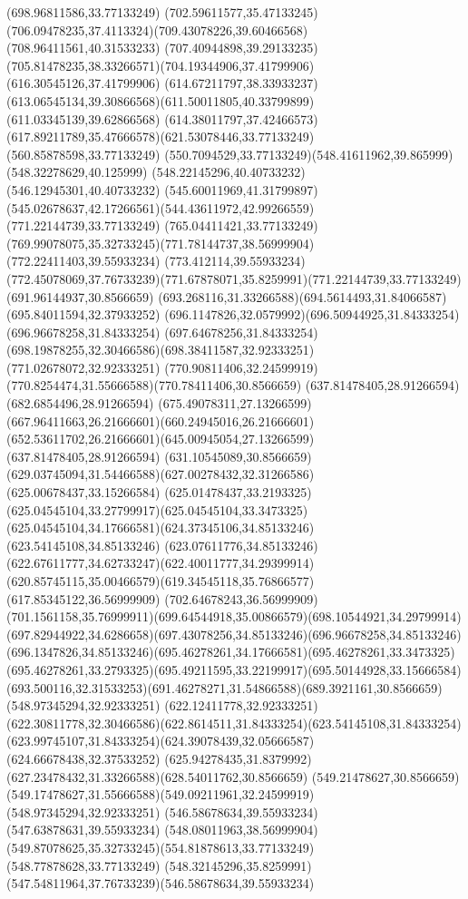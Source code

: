{{\lineto(698.96811586,33.77133249)
\curveto(702.59611577,35.47133245)(706.09478235,37.4113324)(709.43078226,39.60466568)
\lineto(708.96411561,40.31533233)
\curveto(707.40944898,39.29133235)(705.81478235,38.33266571)(704.19344906,37.41799906)
\lineto(616.30545126,37.41799906)
\curveto(614.67211797,38.33933237)(613.06545134,39.30866568)(611.50011805,40.33799899)
\lineto(611.03345139,39.62866568)
\curveto(614.38011797,37.42466573)(617.89211789,35.47666578)(621.53078446,33.77133249)
\lineto(560.85878598,33.77133249)
\curveto(550.7094529,33.77133249)(548.41611962,39.865999)(548.32278629,40.125999)
\lineto(548.22145296,40.40733232)
\lineto(546.12945301,40.40733232)
\curveto(545.60011969,41.31799897)(545.02678637,42.17266561)(544.43611972,42.99266559)
\closepath
\moveto(771.22144739,33.77133249)
\lineto(765.04411421,33.77133249)
\curveto(769.99078075,35.32733245)(771.78144737,38.56999904)(772.22411403,39.55933234)
\lineto(773.412114,39.55933234)
\curveto(772.45078069,37.76733239)(771.67878071,35.8259991)(771.22144739,33.77133249)
\moveto(691.96144937,30.8566659)
\curveto(693.268116,31.33266588)(694.5614493,31.84066587)(695.84011594,32.37933252)
\curveto(696.1147826,32.0579992)(696.50944925,31.84333254)(696.96678258,31.84333254)
\curveto(697.64678256,31.84333254)(698.19878255,32.30466586)(698.38411587,32.92333251)
\lineto(771.02678072,32.92333251)
\curveto(770.90811406,32.24599919)(770.8254474,31.55666588)(770.78411406,30.8566659)
\closepath
\moveto(637.81478405,28.91266594)
\lineto(682.6854496,28.91266594)
\curveto(675.49078311,27.13266599)(667.96411663,26.21666601)(660.24945016,26.21666601)
\curveto(652.53611702,26.21666601)(645.00945054,27.13266599)(637.81478405,28.91266594)
\moveto(631.10545089,30.8566659)
\curveto(629.03745094,31.54466588)(627.00278432,32.31266586)(625.00678437,33.15266584)
\curveto(625.01478437,33.2193325)(625.04545104,33.27799917)(625.04545104,33.3473325)
\curveto(625.04545104,34.17666581)(624.37345106,34.85133246)(623.54145108,34.85133246)
\curveto(623.07611776,34.85133246)(622.67611777,34.62733247)(622.40011777,34.29399914)
\curveto(620.85745115,35.00466579)(619.34545118,35.76866577)(617.85345122,36.56999909)
\lineto(702.64678243,36.56999909)
\curveto(701.1561158,35.76999911)(699.64544918,35.00866579)(698.10544921,34.29799914)
\curveto(697.82944922,34.6286658)(697.43078256,34.85133246)(696.96678258,34.85133246)
\curveto(696.1347826,34.85133246)(695.46278261,34.17666581)(695.46278261,33.3473325)
\curveto(695.46278261,33.2793325)(695.49211595,33.22199917)(695.50144928,33.15666584)
\curveto(693.500116,32.31533253)(691.46278271,31.54866588)(689.3921161,30.8566659)
\closepath
\moveto(548.97345294,32.92333251)
\lineto(622.12411778,32.92333251)
\curveto(622.30811778,32.30466586)(622.8614511,31.84333254)(623.54145108,31.84333254)
\curveto(623.99745107,31.84333254)(624.39078439,32.05666587)(624.66678438,32.37533252)
\curveto(625.94278435,31.8379992)(627.23478432,31.33266588)(628.54011762,30.8566659)
\lineto(549.21478627,30.8566659)
\curveto(549.17478627,31.55666588)(549.09211961,32.24599919)(548.97345294,32.92333251)
\moveto(546.58678634,39.55933234)
\lineto(547.63878631,39.55933234)
\curveto(548.08011963,38.56999904)(549.87078625,35.32733245)(554.81878613,33.77133249)
\lineto(548.77878628,33.77133249)
\curveto(548.32145296,35.8259991)(547.54811964,37.76733239)(546.58678634,39.55933234)
}
}
